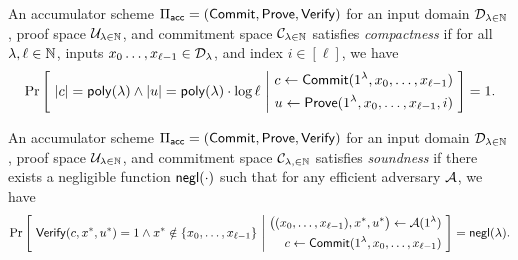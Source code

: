 \newcommand{\polylog}{\ms{polylog}}
\newcommand{\len}{\ms{len}}
\newcommand{\logg}{{\ms{log}}}

\newcommand{\xstar}{x^*}
\newcommand{\ustar}{u^*}

\begin{definition}[Compactness]
    \label{def:compactness}
    An accumulator scheme $\Pi_{\mathsf{acc}} = (\mathsf{Commit}, \mathsf{Prove}, \mathsf{Verify})$ for an input
    domain $\mathcal{D}_{\lambda \in \mathbb{N}}$, proof space $\mathcal{U}_{\lambda \in \mathbb{N}}$, and
    commitment space $\mathcal{C}_{\lambda \in \mathbb{N}}$ satisfies \emph{compactness}
    if for all $\lambda, \ell \in \mathbb{N}$, inputs $x_0 \ldots, x_{\ell-1} \in
    \mathcal{D}_\lambda$, and index $i \in [\ell]$, we have
    \[ \Pr \left[~ |c| = \mathsf{poly}(\lambda) \land |u| = \mathsf{poly}(\lambda) \cdot \log
        \ell ~\Bigg|~ \begin{aligned} c \gets \mathsf{Commit}(1^\lambda, x_0, \ldots,
        x_{\ell-1}) \\ u \gets \mathsf{Prove}(1^\lambda, x_0, \ldots, x_{\ell-1}, i) 
        \end{aligned} ~\right] = 1 .\]
\end{definition}

\begin{definition}[Soundness]
    \label{def:soundness}
    An accumulator scheme $\Pi_{\mathsf{acc}} = (\mathsf{Commit}, \mathsf{Prove}, \mathsf{Verify})$ for an input
    domain $\mathcal{D}_{\lambda \in \mathbb{N}}$, proof space $\mathcal{U}_{\lambda \in \mathbb{N}}$, and
    commitment space $\mathcal{C}_{\lambda, \in \mathbb{N}}$ satisfies \emph{soundness} if
    there exists a negligible function $\mathsf{negl}(\cdot)$ such that for any
    efficient adversary $\mathcal{A}$, we have
    \[ \Pr\left[~ \Verify(c, \xstar, \ustar) = 1 \land \xstar \notin \{x_0,
        \ldots, x_{\ell-1}\} ~\Bigg|~ \begin{aligned}
    \big((x_0, \ldots, x_{\ell-1}), \xstar, \ustar \big) \gets \calA(1^\lambda)
    \\ c \gets \Commit(1^\lambda, x_0, \ldots, x_{\ell-1}) \end{aligned} ~\right] =
    \negl(\lambda) .\]
\end{definition}

